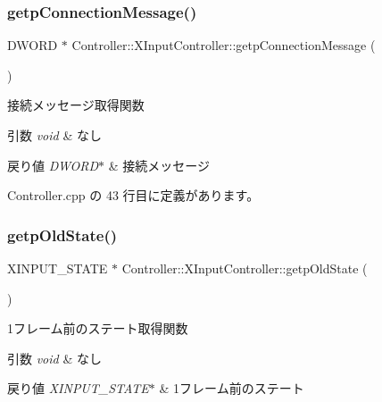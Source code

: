 \subsubsection{\texorpdfstring{getp\+Connection\+Message()}{getpConnectionMessage()}}
{\footnotesize\ttfamily D\+W\+O\+RD $\ast$ Controller\+::\+X\+Input\+Controller\+::getp\+Connection\+Message (\begin{DoxyParamCaption}{ }\end{DoxyParamCaption})}



接続メッセージ取得関数 


\begin{DoxyParams}{引数}
{\em void} & なし \\
\hline
\end{DoxyParams}

\begin{DoxyRetVals}{戻り値}
{\em D\+W\+O\+R\+D$\ast$} & 接続メッセージ \\
\hline
\end{DoxyRetVals}


 Controller.\+cpp の 43 行目に定義があります。

\mbox{\label{class_controller_1_1_x_input_controller_aa8341af2132808335e28268e57b7ffc2}} 
\subsubsection{\texorpdfstring{getp\+Old\+State()}{getpOldState()}}
{\footnotesize\ttfamily X\+I\+N\+P\+U\+T\+\_\+\+S\+T\+A\+TE $\ast$ Controller\+::\+X\+Input\+Controller\+::getp\+Old\+State (\begin{DoxyParamCaption}{ }\end{DoxyParamCaption})}



1フレーム前のステート取得関数 


\begin{DoxyParams}{引数}
{\em void} & なし \\
\hline
\end{DoxyParams}

\begin{DoxyRetVals}{戻り値}
{\em X\+I\+N\+P\+U\+T\+\_\+\+S\+T\+A\+T\+E$\ast$} & 1フレーム前のステート \\
\hline
\end{DoxyRetVals}


